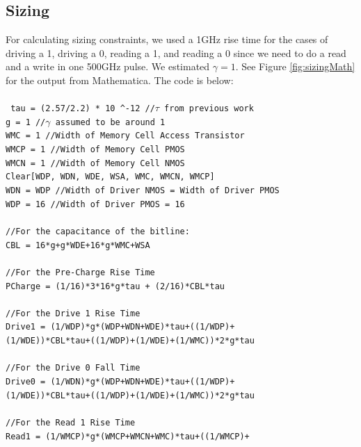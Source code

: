 \documentclass[a4paper]{article}
\def\code#1{\texttt{#1}}
\newcommand\tab[1][1cm]{\hspace*{#1}}
\begin{document}
\subsection{Sizing}
For calculating sizing constraints, we used a 1GHz rise time for the cases of driving a 1, driving a 0, reading a 1, and reading a 0 since we need to do a read and a write in one 500GHz pulse. We estimated $\gamma = 1$. See Figure \ref{fig:sizingMath} for the output from Mathematica. The code is below:
\\\\\noindent
\code {
tau = (2.57/2.2) * 10 \textasciicircum -12 \textnormal{//$\tau$ from previous work}\\
g = 1 \textnormal{//$\gamma$ assumed to be around 1}\\
WMC = 1 \textnormal{//Width of Memory Cell Access Transistor}\\
WMCP = 1 \textnormal{//Width of Memory Cell PMOS}\\
WMCN = 1 \textnormal{//Width of Memory Cell NMOS}\\
Clear[WDP, WDN, WDE, WSA, WMC, WMCN, WMCP]\\
WDN = WDP \textnormal{//Width of Driver NMOS = Width of Driver PMOS}\\
WDP = 16 \textnormal{//Width of Driver PMOS = 16}\\
\\
\textnormal{//For the capacitance of the bitline:}\\
CBL = 16*g+g*WDE+16*g*WMC+WSA\\
\\
\textnormal{//For the Pre-Charge Rise Time}\\
PCharge = (1/16)*3*16*g*tau + (2/16)*CBL*tau\\
\\
\textnormal{//For the Drive 1 Rise Time}\\
Drive1 = (1/WDP)*g*(WDP+WDN+WDE)*tau+((1/WDP)+\\
\tab (1/WDE))*CBL*tau+((1/WDP)+(1/WDE)+(1/WMC))*2*g*tau\\
\\
\textnormal{//For the Drive 0 Fall Time}\\
Drive0 = (1/WDN)*g*(WDP+WDN+WDE)*tau+((1/WDP)+\\
\tab (1/WDE))*CBL*tau+((1/WDP)+(1/WDE)+(1/WMC))*2*g*tau\\
\\
\textnormal{//For the Read 1 Rise Time}\\
Read1 = (1/WMCP)*g*(WMCP+WMCN+WMC)*tau+((1/WMCP)+\\
}
\end{document}
